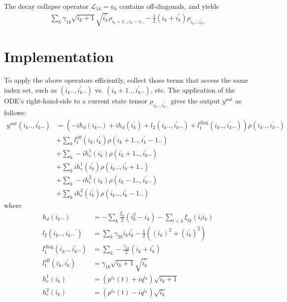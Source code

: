 \documentclass[letterpaper]{article}
\newcommand{\Ell}{\mathcal{L}}
\begin{document}
\begin{enumerate}
    The decay collapse operator $\Ell_{1k} = a_k$ contains off-diagonals, and yields
    \begin{align}
        \sum_k \gamma_{1k} \sqrt{i_k+1}\sqrt{i_k^\prime} \rho_{i_k+1.., i_k-1..} - \frac 12 \left( i_k+ i_k^\prime \right)\rho_{i_k.., i_k^\prime..} 
    \end{align}
      
\end{enumerate}

\section{Implementation}

  To apply the above operators efficiently, collect those terms that access the same index set, such as $(i_k..,i_k^\prime..)$ vs. $(i_k+1.., i_k^\prime..)$, etc. The application of the ODE's right-hand-side to a current state tensor $\rho_{i_k..,i_k^\prime..}$ gives the output $y^{out}$ as follows:
  \begin{align}
       y^{out}(i_k..,i_k^\prime..)  &= 
       \left(-i h_d(i_k..) + ih_d(i_k^\prime)
        + l_2(i_k..,i_k^\prime..) + l_1^{\text{diag}}(i_k.., i_k^\prime..) \right) \rho(i_k..,i_k^\prime..) \\
        &+ \sum_k l_1^{\text{off}}(i_k, i_k^\prime) \rho(i_k+1.., i_k^\prime -1..)\\
        &+ \sum_k -i h_c^1(i_k) \rho(i_k+1.., i_k^\prime..) \\
        &+ \sum_k ih_c^1(i_k^\prime) \rho(i_k..,i_k^\prime +1 ..) \\
        &+ \sum_k -i h_c^2(i_k) \rho(i_k-1.., i_k^\prime..) \\
        &+ \sum_k ih_c^2(i_k^\prime) \rho(i_k..,i_k^\prime -1 ..) 
  \end{align}
  where 
  \begin{align}
    h_d(i_k..) &= -\sum_k \frac{\xi_k}{2}(i_k^2 - i_k) - \sum_{l<k} \xi_{lk} (i_l i_k) \\
    l_2(i_k..,i_k..^\prime) &= \sum_k \gamma_{2k} i_ki_k^\prime - \frac 12 \left( (i_k)^2 + (i_k^\prime)^2\right)\\
    l_1^{\text{diag}}(i_k.., i_k^\prime..) &= \sum_k -\frac{\gamma_{1k}}{2}\left(i_k + i_k^\prime\right) \\
    l_1^{\text{off}}(i_k,i_k^\prime) &= \gamma_{1k} \sqrt{i_k+1}\sqrt{i_k^\prime} \\
    h_c^1(i_k) &= \left(p^{i_k}(t) + iq^{i_k}\right)\sqrt{i_k+1} \\
    h_c^2(i_k) &= \left(p^{i_k}(t) - iq^{i_k}\right)\sqrt{i_k} 
  \end{align}
  
\end{document}
